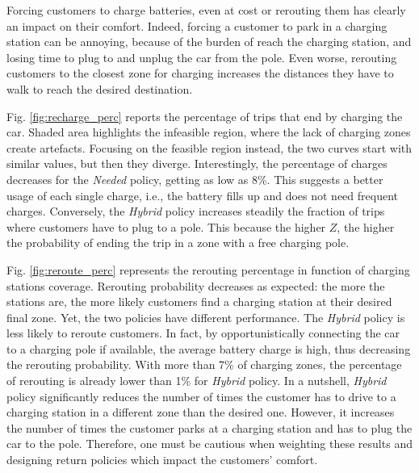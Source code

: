 \documentclass[review, letterpaper,3p, 11pt]{elsarticle}
\begin{document}
Forcing customers to charge batteries, even at cost or rerouting them has clearly an impact on their comfort. Indeed, forcing a customer to park in a charging station can be annoying, because of the burden of reach the charging station, and losing time to plug to and unplug the car from the pole. Even worse, rerouting customers to the closest zone for charging increases the distances they have to walk to reach the desired destination. 

Fig. \ref{fig:recharge_perc} reports the percentage of trips that end by charging the car. Shaded area highlights the infeasible region, where the lack of charging zones create artefacts. Focusing on the feasible region instead, the two curves start with similar values, but then they diverge. Interestingly, the percentage of charges decreases for the \textit{Needed} policy, getting as low as 8\%. This suggests a better usage of each single charge, i.e., the battery fills up and does not need frequent charges. 
Conversely, the \textit{Hybrid} policy increases steadily the fraction of trips where customers have to plug to a pole. This because the higher $Z$, the higher the probability of ending the trip in a zone with a free charging pole.

Fig. \ref{fig:reroute_perc} represents the rerouting percentage in function of charging stations coverage.
Rerouting probability decreases as expected: the more the stations are, the more likely customers find a charging station at their desired final zone. Yet, the two policies have different performance. The \textit{Hybrid} policy is less likely to reroute customers. In fact, by opportunistically connecting the car to a charging pole if available, the average battery charge is high, thus decreasing the rerouting probability. With more than 7\% of charging zones, the percentage of rerouting is already lower than 1\% for \textit{Hybrid} policy.
In a nutshell, \textit{Hybrid} policy significantly reduces the number of times the customer has to drive to a charging station in a different zone than the desired one. However, it increases the number of times the customer parks at a charging station and has to plug the car to the pole. Therefore, one must be cautious when weighting these results and designing return policies which impact the customers' comfort. 
\end{document}
